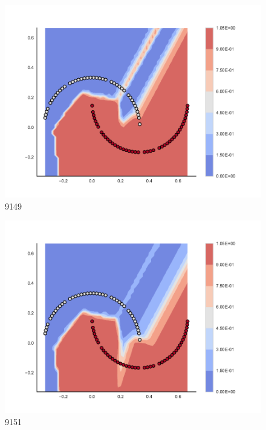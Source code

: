 \begin{subfigure}[b]{0.09\textwidth}
    \includegraphics[clip, trim=2.35cm 1.75cm 4.5cm 0cm,width=\textwidth]{img/convergence/9149.pdf}
    \caption{9149}
    \label{fig:convergence_9149}
\end{subfigure}
%
\begin{subfigure}[b]{0.09\textwidth}
    \includegraphics[clip, trim=2.35cm 1.75cm 4.5cm 0cm,width=\textwidth]{img/convergence/9151.pdf}
    \caption{9151}
    \label{fig:convergence_9151}
\end{subfigure}
%
